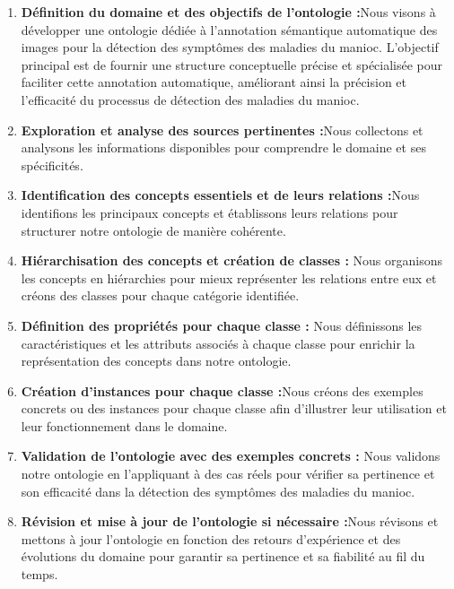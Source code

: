 \documentclass{article}
\begin{document}
		
		\begin{enumerate}
			\item  \textbf{ Définition du domaine et des objectifs de l’ontologie :}Nous visons à développer une ontologie dédiée à l'annotation sémantique automatique des images pour la détection des symptômes des maladies du manioc. L'objectif principal est de fournir une structure conceptuelle précise et spécialisée pour faciliter cette annotation automatique, améliorant ainsi la précision et l'efficacité du processus de détection des maladies du manioc.
			
			\item  \textbf{ Exploration et analyse des sources pertinentes :}Nous collectons et analysons les informations disponibles pour comprendre le domaine et ses spécificités.
			
			\item  \textbf{ Identification des concepts essentiels et de leurs relations :}Nous identifions les principaux concepts et établissons leurs relations pour structurer notre ontologie de manière cohérente.
			
			\item  \textbf{ Hiérarchisation des concepts et création de classes : } Nous organisons les concepts en hiérarchies pour mieux représenter les relations entre eux et créons des classes pour chaque catégorie identifiée.
			
			\item  \textbf{ Définition des propriétés pour chaque classe :} Nous définissons les caractéristiques et les attributs associés à chaque classe pour enrichir la représentation des concepts dans notre ontologie.
			
			\item  \textbf{ Création d'instances pour chaque classe :}Nous créons des exemples concrets ou des instances pour chaque classe afin d'illustrer leur utilisation et leur fonctionnement dans le domaine.
			
			\item  \textbf{ Validation de l'ontologie avec des exemples concrets : } Nous validons notre ontologie en l'appliquant à des cas réels pour vérifier sa pertinence et son efficacité dans la détection des symptômes des maladies du manioc.
			
			\item  \textbf{ Révision et mise à jour de l'ontologie si nécessaire :}Nous révisons et mettons à jour l'ontologie en fonction des retours d'expérience et des évolutions du domaine pour garantir sa pertinence et sa fiabilité au fil du temps.
			
			
		\end{enumerate}
		
\end{document}
